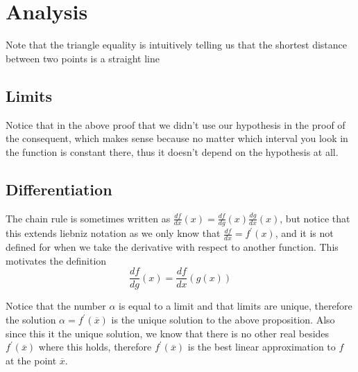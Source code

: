 \documentclass{standalone}
\begin{document}
\chapter{Analysis}


Note that the triangle equality is intuitively telling us that the shortest distance between two points is a straight line


\section{Limits}


Notice that in the above proof that we didn't use our hypothesis in the proof of the consequent, which makes sense because no matter which interval you look in the function is constant there, thus it doesn't depend on the hypothesis at all.




\newpage

\section{Differentiation}



The chain rule is sometimes written as $ \frac{df }{dx} \left( x \right) = \frac{df}{dg} \left( x \right) \frac{dg}{dx} \left( x \right)  $, but notice that this extends liebniz notation as we only know that $ \frac{df}{dx} = f ^{ \prime  } \left( x \right)   $, and it is not defined for when we take the derivative with respect to another function. This motivates the definition
\[
\frac{df}{dg} \left( x \right) =  \frac{df}{dx} \left( g\left( x \right)  \right)
\]

Notice that the number $ \alpha $ is equal to a limit and that limits are unique, therefore the solution $ \alpha =  f ^{ \prime } \left( \overline{x} \right)  $ is the unique solution to the above proposition. Also since this it the unique solution, we know that there is no other real besides $ f ^{ \prime } \left( \overline{x} \right)  $ where this holds, therefore $ f ^{ \prime } \left( \overline{x} \right)  $ is the best linear approximation to $ f $ at the point $ \overline{x} $. 
\end{document}

